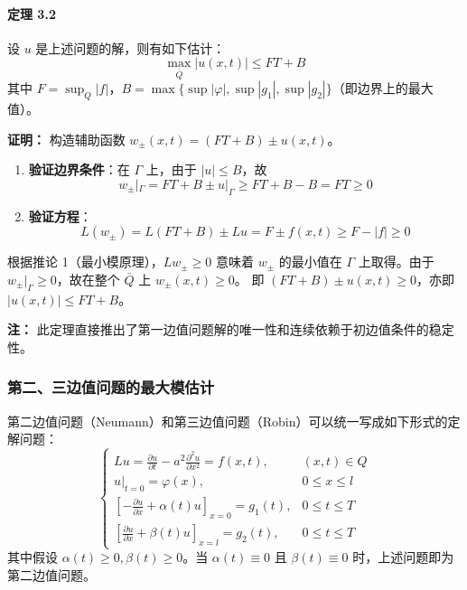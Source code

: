 \documentclass[12pt,a4paper]{ctexart}
\begin{document}
	\paragraph{定理 3.2}
	设 $u$ 是上述问题的解，则有如下估计：
	\begin{equation}
		\max_{\bar{Q}} |u(x,t)| \leqslant F T + B
	\end{equation}
	其中 $F = \sup_Q |f|$，$B = \max \{ \sup|\varphi|, \sup|g_1|, \sup|g_2| \}$（即边界上的最大值）。
	
	\textbf{证明：}
	构造辅助函数 $w_{\pm}(x,t) = (FT + B) \pm u(x,t)$。
	\begin{enumerate}
		\item \textbf{验证边界条件}：在 $\Gamma$ 上，由于 $|u| \leqslant B$，故
		\[
		w_{\pm}|_{\Gamma} = FT + B \pm u|_{\Gamma} \geqslant FT + B - B = FT \geqslant 0
		\]
		\item \textbf{验证方程}：
		\[
		L(w_{\pm}) = L(FT + B) \pm Lu = F \pm f(x,t) \geqslant F - |f| \geqslant 0
		\]
	\end{enumerate}
	根据推论 1（最小模原理），$Lw_{\pm} \geqslant 0$ 意味着 $w_{\pm}$ 的最小值在 $\Gamma$ 上取得。由于 $w_{\pm}|_{\Gamma} \geqslant 0$，故在整个 $\bar{Q}$ 上 $w_{\pm}(x,t) \geqslant 0$。
	即 $(FT + B) \pm u(x,t) \geqslant 0$，亦即 $|u(x,t)| \leqslant FT + B$。
	
	\textbf{注：} 此定理直接推出了第一边值问题解的唯一性和连续依赖于初边值条件的稳定性。
	
	\subsubsection{第二、三边值问题的最大模估计}
	
	第二边值问题（Neumann）和第三边值问题（Robin）可以统一写成如下形式的定解问题：
	\begin{equation}
		\begin{cases}
			L u = \frac{\partial u}{\partial t} - a^2 \frac{\partial^2 u}{\partial x^2} = f(x,t), & (x,t) \in Q \\
			u|_{t=0} = \varphi(x), & 0 \leqslant x \leqslant l \\
			\left[ -\frac{\partial u}{\partial x} + \alpha(t) u \right]_{x=0} = g_1(t), & 0 \leqslant t \leqslant T \\
			\left[ \frac{\partial u}{\partial x} + \beta(t) u \right]_{x=l} = g_2(t), & 0 \leqslant t \leqslant T
		\end{cases}
		\label{eq:mixed_bvp}
	\end{equation}
	其中假设 $\alpha(t) \geqslant 0, \beta(t) \geqslant 0$。当 $\alpha(t) \equiv 0$ 且 $\beta(t) \equiv 0$ 时，上述问题即为第二边值问题。
	
\end{document}
